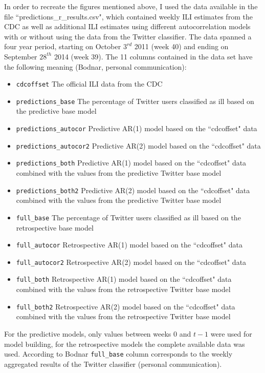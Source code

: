 \documentclass[11pt, a4paper,twoside]{report}\usepackage[]{graphicx}\usepackage[]{color}
\begin{document}
In order to recreate the figures mentioned above, I used the data available in the file ``predictions\_r\_results.csv", which contained weekly ILI estimates from the CDC as well as additional ILI estimates using different autocorrelation models with or without using the data from the Twitter classifier. The data spanned a four year period, starting on October $3^{rd}$ 2011 (week 40) and ending on September $28^{th}$ 2014 (week 39). The 11 columns contained in the data set have the following meaning (Bodnar, personal communication):

\begin{itemize}
  \item \texttt{cdcoffset} The official ILI data from the CDC
  \item \texttt{predictions\_base} The percentage of Twitter users classified as ill based on the predictive base model
  \item \texttt{predictions\_autocor} Predictive AR(1) model based on the ``cdcoffset" data
  \item \texttt{predictions\_autocor2} Predictive AR(2) model based on the ``cdcoffset" data
  \item \texttt{predictions\_both} Predictive AR(1) model based on the ``cdcoffset" data combined with the values from the predictive Twitter base model
  \item \texttt{predictions\_both2} Predictive AR(2) model based on the ``cdcoffset" data combined with the values from the predictive Twitter base model
 \item \texttt{full\_base} The percentage of Twitter users classified as ill based on the retrospective base model
  \item \texttt{full\_autocor} Retrospective AR(1) model based on the ``cdcoffset" data
  \item \texttt{full\_autocor2} Retrospective AR(2) model based on the ``cdcoffset" data
  \item \texttt{full\_both} Retrospective AR(1) model based on the ``cdcoffset" data combined with the values from the retrospective Twitter base model
  \item \texttt{full\_both2} Retrospective AR(2) model based on the ``cdcoffset" data combined with the values from the retrospective Twitter base model
\end{itemize}

For the predictive models, only values between weeks $0$ and $t-1$ were used for model building, for the retrospective models the complete available data was used. According to Bodnar \texttt{full\_base} column corresponds to the weekly aggregated results of the Twitter classifier (personal communication).
\end{document}
